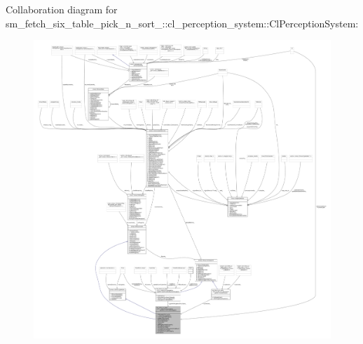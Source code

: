 Collaboration diagram for sm\+\_\+fetch\+\_\+six\+\_\+table\+\_\+pick\+\_\+n\+\_\+sort\+\_\+:\+:cl\+\_\+perception\+\_\+system\+:\+:Cl\+Perception\+System\+:
\nopagebreak
\begin{figure}[H]
\begin{center}
\leavevmode
\includegraphics[width=350pt]{classsm__fetch__six__table__pick__n__sort__1_1_1cl__perception__system_1_1ClPerceptionSystem__coll__graph}
\end{center}
\end{figure}
